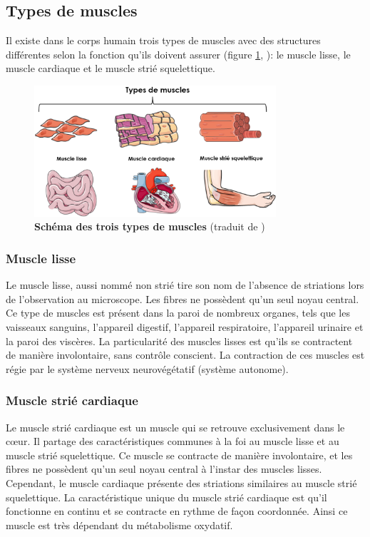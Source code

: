 \subsection{Types de muscles}
Il existe dans le corps humain trois types de muscles avec des structures différentes selon la fonction qu'ils doivent assurer (figure \ref{fig:muscle-type}, \cite{gomez_oca_physiological_2021}): le muscle lisse, le muscle cardiaque et le muscle strié squelettique.
\begin{figure}[!ht]
 \centering
 \includegraphics[width=0.8\textwidth]{figures/muscle_type.png}
 \caption[Schéma des trois types de muscles]{\textbf{Schéma des trois types de muscles} (traduit de \cite{gomez_oca_physiological_2021})}
 \label{fig:muscle-type}
\end{figure}
\subsubsection{Muscle lisse}
Le muscle lisse, aussi nommé non strié tire son nom de l'absence de striations lors de l'observation au microscope. Les fibres ne possèdent qu'un seul noyau central. Ce type de muscles est présent dans la paroi de nombreux organes, tels que  les vaisseaux sanguins, l'appareil digestif, l'appareil respiratoire, l'appareil urinaire et la paroi des viscères. La particularité des muscles lisses est qu'ils se contractent de manière involontaire, sans contrôle conscient. La contraction de ces muscles est régie par le système nerveux neurovégétatif (système autonome).

\subsubsection{Muscle strié cardiaque}
Le muscle strié cardiaque est un muscle qui se retrouve exclusivement dans le cœur. Il partage des caractéristiques communes à la foi au muscle lisse et au muscle strié squelettique. Ce muscle se contracte de manière involontaire, et les fibres ne possèdent qu'un seul noyau central à l'instar des muscles lisses. Cependant, le muscle cardiaque présente des striations similaires au muscle strié squelettique. La caractéristique unique du muscle strié cardiaque est qu'il fonctionne en continu et se contracte en rythme de façon coordonnée. Ainsi ce muscle est très dépendant du métabolisme oxydatif.

